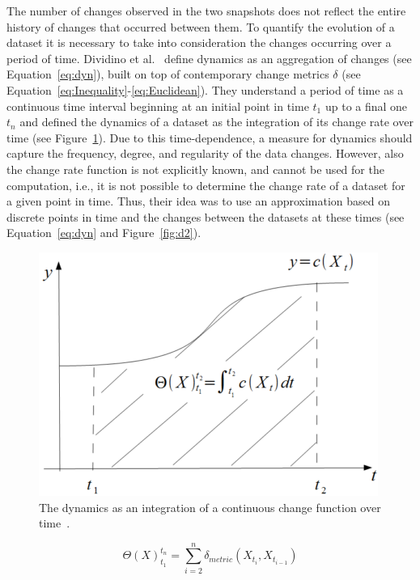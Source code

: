 \documentclass[sw]{iosart2x}
\begin{document}
The number of changes observed in the two snapshots does not reflect the entire history of changes that occurred between them. To quantify the evolution of a dataset it is necessary to take into consideration the changes occurring over a period of time. Dividino et al.~\cite{DividinoGSG14} define dynamics as an aggregation of changes (see Equation~\ref{eq:dyn}), built on top of contemporary change metrics $\delta$ (see Equation~\ref{eq:Inequality}-\ref{eq:Euclidean}). They understand a period of time as a continuous time interval beginning at an initial point in time $t_1$ up to a final one $t_n$ and defined the dynamics of a dataset as the integration of its change rate over time (see Figure~\ref{fig:d1}). Due to this time-dependence, a measure for dynamics should capture the frequency, degree, and regularity of the data changes. However, also the change rate function is not explicitly known, and cannot be used for the computation, i.e., it is not possible to determine the change rate of a dataset for a given point in time. Thus, their idea was to use an approximation based on discrete points in time and the changes between the datasets at these times (see Equation~\ref{eq:dyn} and Figure~\ref{fig:d2}).

\begin{figure}[h]
	\centering
	\includegraphics[scale=0.4]{img/d1.png}
	\caption{The dynamics as an integration of a continuous change function over time~\cite{DividinoGSG14}.}
	\label{fig:d1}
\end{figure}

\begin{equation}
\label{eq:dyn}
\Theta(X)^{t_n}_{t_1} = \sum_{i = 2}^{n} \delta_{metric}(X_{t_i}, X_{t_{i-1}})
\end{equation}
\end{document}
